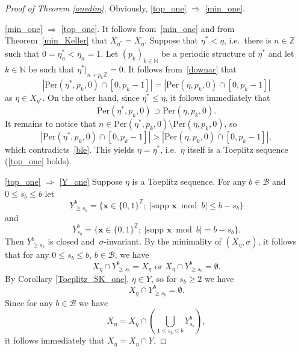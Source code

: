 \documentclass[leqno,a4paper,12pt]{article}
\theoremstyle{definition}
\newcommand{\Z}{{\mathbb{Z}}}
\newcommand{\N}{{\mathbb{N}}}
\newcommand{\sB}{\mathscr{B}}
\begin{document}
\begin{proof}[Proof of Theorem \ref{onedim}]
Obviously, \eqref{top_one} $\Rightarrow$ \eqref{min_one}.

\eqref{min_one} $\Rightarrow$ \eqref{top_one}.
It follows from~\eqref{min_one} and from Theorem~\ref{min_Keller} that $X_{\eta^*}=X_{\eta}$. Suppose that $\eta^*<\eta$, i.e.\ there is $n\in\Z$ such that $0=\eta^*_n<\eta_n=1$. Let $(p_k)_{k\in\N}$ be a periodic structure of $\eta^*$ and let $k\in\N$ be such that $\eta^*|_{n+p_k\Z}=0$. It follows from~\eqref{downar} that
\begin{equation}\label{ble}
|\text{Per}(\eta^*,p_k,0)\cap [0,p_k-1]|=|\text{Per}(\eta,p_k,0)\cap[0,p_k-1]|
\end{equation}
as $\eta\in X_{\eta^*}$.  On the other hand, since $\eta^*\leq \eta$, it follows immediately that
\[
\text{Per}(\eta^*,p_k,0) \supset \text{Per}(\eta,p_k,0).
\]
It remains to notice that
$n\in \text{Per}(\eta^*,p_k,0)\setminus \text{Per}(\eta,p_k,0)$, so
\[
|\text{Per}(\eta^*,p_k,0) \cap [0,p_k-1]| > |\text{Per}(\eta,p_k,0)\cap [0,p_k-1]|,
\]
which contradicts~\eqref{ble}. This yields $\eta=\eta^*$, i.e.\ $\eta$ itself is a Toeplitz sequence (\eqref{top_one} holds).

\eqref{top_one} $\Rightarrow$ \eqref{Y_one} Suppose $\eta$ is a Toeplitz sequence. %
For any $b\in\sB$ and~$0\leq s_b\leq b$ let \[Y^b_{\geq s_b}=\{\bm{x}\in \{0,1\}^\Z;\ |\text{supp }\bm{x}\bmod b|\leq b-s_b\}\] and \[Y^b_{s_b}=\{\bm{x}\in \{0,1\}^\Z;\ |\text{supp }\bm{x}\bmod b|=b-s_b\}.\] Then $Y^b_{\geq s_b}$ is closed and~$\sigma$-invariant. By the minimality of $(X_\eta,\sigma)$, it follows that for any $0\leq s_b\leq b$, $b\in\sB$, we have
\[
X_\eta \cap Y^b_{\geq s_b}=X_\eta\text{ or }X_\eta \cap Y^b_{\geq s_b}=\emptyset.
\]
By Corollary \ref{Toeplitz_SK_one}, $\eta\in Y$, so for $s_b\geq 2$ we have
\[
X_\eta \cap Y^b_{\geq s_b}=\emptyset.
\]
Since for any $b\in\sB$ we have
\[
X_\eta=X_\eta \cap \left(\bigcup_{1\leq s_b\leq b}Y^b_{s_b}\right),
\]
it follows immediately that $X_\eta=X_\eta\cap Y$.


\end{proof}
\end{document}
